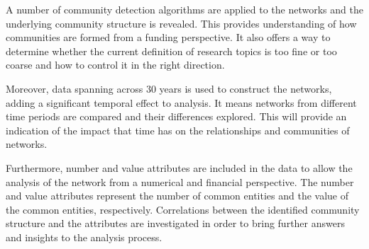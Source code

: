A number of community detection algorithms are applied to the networks and the underlying community structure is revealed. This provides understanding of how communities are formed from a funding perspective. It also offers a way to determine whether the current definition of research topics is too fine or too coarse and how to control it in the right direction.

Moreover, data spanning across 30 years is used to construct the networks, adding a significant temporal effect to analysis. It means networks from different time periods are compared and their differences explored. This will provide an indication of the impact that time has on the relationships and communities of networks.

Furthermore, number and value attributes are included in the data to allow the analysis of the network from a numerical and financial perspective. The number and value attributes represent the number of common entities and the value of the common entities, respectively. Correlations between the identified community structure and the attributes are investigated in order to bring further answers and insights to the analysis process.
\fi

\iffalse
\section{Self-assessment}
I believe that the outcomes of this study are both interesting and valuable. In particular, detecting community structure in networks was something new for me and led me to develop a growing interest in the subject.

Working on this project offered me the opportunity to find answers to real world issues through network analysis. The results of this study range from constructing a number of networks from external data to determining whether the networks hold a community structure and subsequently identifying it.

Three aspects that I found extremely interesting to analyse were the time, numerical and financial factors of the data. Comparing networks from different time periods provided interesting results that answer questions in regards to the transition of the network's general and community structure.

Additionally, observing networks from a numerical and financial standpoint led to insightful results providing answers to question regarding specific network behaviours.

Overall, gaining an understanding of how communities are structured within research networks was extremely engaging, as it answered questions in regards to how the definition of topics could be improved, which would remain unanswered without network analysis.
\fi